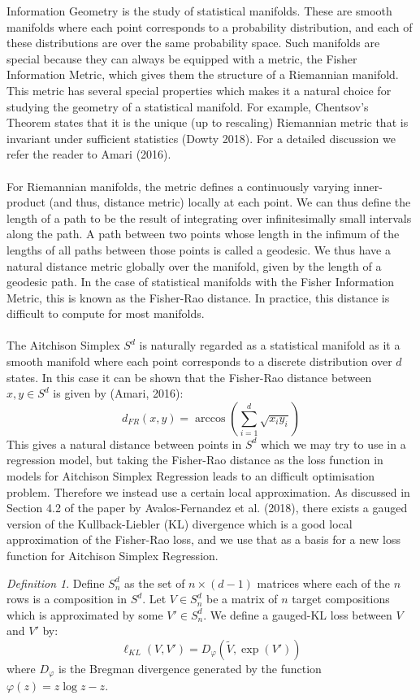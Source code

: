 \documentclass[BSc]{usydthesis}
\numberwithin{equation}{chapter}
\theoremstyle{remark}
\newtheorem{Definition}[equation]{Definition}
\begin{document}
Information Geometry is the study of statistical manifolds. These are smooth manifolds where each point corresponds to a probability distribution, and each of these distributions are over the same probability space. Such manifolds are special because they can always be equipped with a metric, the Fisher Information Metric, which gives them the structure of a Riemannian manifold. This metric has several special properties which makes it a natural choice for studying the geometry of a statistical manifold. For example, Chentsov's Theorem states that it is the unique (up to rescaling) Riemannian metric that is invariant under sufficient statistics (Dowty 2018). For a detailed discussion we refer the reader to Amari (2016).\\
\\
For Riemannian manifolds, the metric defines a continuously varying inner-product (and thus, distance metric) locally at each point. We can thus define the length of a path to be the result of integrating over infinitesimally small intervals along the path. A path between two points whose length in the infimum of the lengths of all paths between those points is called a geodesic. We thus have a natural distance metric globally over the manifold, given by the length of a geodesic path. In the case of statistical manifolds with the Fisher Information Metric, this is known as the Fisher-Rao distance. In practice, this distance is difficult to compute for most manifolds. \\
\\
The Aitchison Simplex $S^d$ is naturally regarded as a statistical manifold as it a smooth manifold where each point corresponds to a discrete distribution over $d$ states. In this case it can be shown that the Fisher-Rao distance between $x,y\in S^d$ is given by (Amari, 2016):
$$ d_{FR}(x,y) = \operatorname{arccos}\left( \sum_{i=1}^d \sqrt{x_i y_i} \right)$$
This gives a natural distance between points in $S^d$ which we may try to use in a regression model, but taking the Fisher-Rao distance as the loss function in models for Aitchison Simplex Regression leads to an difficult optimisation problem. Therefore we instead use a certain local approximation. As discussed in Section 4.2 of the paper by Avalos-Fernandez et al. (2018), there exists a gauged version of the Kullback-Liebler (KL) divergence which is a good local approximation of the Fisher-Rao loss, and we use that as a basis for a new loss function for Aitchison Simplex Regression.
\begin{Definition}
 Define $S^d_n$ as the set of $n \times (d-1)$ matrices where each of the $n$ rows is a composition in $S^d.$ Let $V\in S^d_n$ be a matrix of $n$ target compositions which is approximated by some $V'\in S^d_n$.
We define a gauged-KL loss between $V$ and $V'$ by:
$$ \ell_{KL} (V,V') = D_{\varphi}\left( \tilde{V}, \exp(V')\right)$$
where $D_{\varphi}$ is the Bregman divergence generated by the function $\varphi(z) = z \log z - z.$
\end{Definition}
\end{document}
